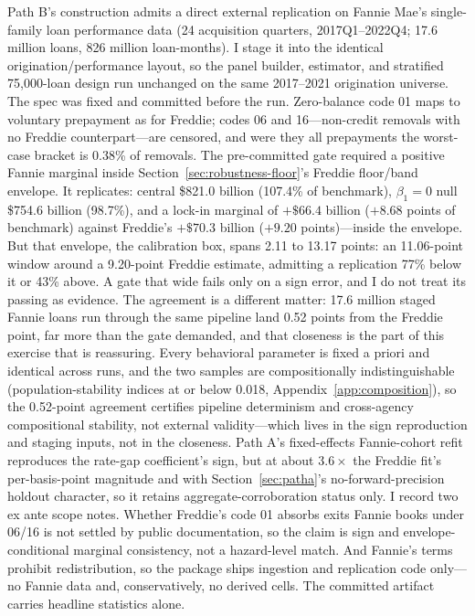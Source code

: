 Path B's construction admits a direct external replication on Fannie Mae's single-family loan performance data (24 acquisition quarters, 2017Q1--2022Q4; 17.6 million loans, 826 million loan-months). I stage it into the identical origination/performance layout, so the panel builder, estimator, and stratified 75{,}000-loan design run unchanged on the same 2017--2021 origination universe. The spec was fixed and committed before the run. Zero-balance code 01 maps to voluntary prepayment as for Freddie; codes 06 and 16---non-credit removals with no Freddie counterpart---are censored, and were they all prepayments the worst-case bracket is 0.38\% of removals. The pre-committed gate required a positive Fannie marginal inside Section~\ref{sec:robustness-floor}'s Freddie floor/band envelope. It replicates: central \$821.0 billion (107.4\% of benchmark), $\beta_1 = 0$ null \$754.6 billion (98.7\%), and a lock-in marginal of $+\$66.4$ billion ($+8.68$ points of benchmark) against Freddie's $+\$70.3$ billion ($+9.20$ points)---inside the envelope. But that envelope, the calibration box, spans 2.11 to 13.17 points: an 11.06-point window around a 9.20-point Freddie estimate, admitting a replication 77\% below it or 43\% above. A gate that wide fails only on a sign error, and I do not treat its passing as evidence. The agreement is a different matter: 17.6 million staged Fannie loans run through the same pipeline land 0.52 points from the Freddie point, far more than the gate demanded, and that closeness is the part of this exercise that is reassuring. Every behavioral parameter is fixed a priori and identical across runs, and the two samples are compositionally indistinguishable (population-stability indices at or below 0.018, Appendix~\ref{app:composition}), so the 0.52-point agreement certifies pipeline determinism and cross-agency compositional stability, not external validity---which lives in the sign reproduction and staging inputs, not in the closeness. Path A's fixed-effects Fannie-cohort refit reproduces the rate-gap coefficient's sign, but at about $3.6\times$ the Freddie fit's per-basis-point magnitude and with Section~\ref{sec:patha}'s no-forward-precision holdout character, so it retains aggregate-corroboration status only. I record two ex ante scope notes. Whether Freddie's code 01 absorbs exits Fannie books under 06/16 is not settled by public documentation, so the claim is sign and envelope-conditional marginal consistency, not a hazard-level match. And Fannie's terms prohibit redistribution, so the package ships ingestion and replication code only---no Fannie data and, conservatively, no derived cells. The committed artifact carries headline statistics alone.
